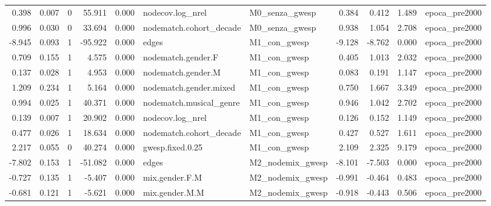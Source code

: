 \begin{table}
\begin{tabular}{rrrrrllrrrl}
    0.398 & 0.007 &        0 &   55.911 &     0.000 &        nodecov.log\_nrel &   M0\_senza\_gwesp &   0.384 &   0.412 &   1.489 &               epoca\_pre2000 \\
    0.996 & 0.030 &        0 &   33.694 &     0.000 & nodematch.cohort\_decade &   M0\_senza\_gwesp &   0.938 &   1.054 &   2.708 &               epoca\_pre2000 \\
   -8.945 & 0.093 &        1 &  -95.922 &     0.000 &                   edges &     M1\_con\_gwesp &  -9.128 &  -8.762 &   0.000 &               epoca\_pre2000 \\
    0.709 & 0.155 &        1 &    4.575 &     0.000 &      nodematch.gender.F &     M1\_con\_gwesp &   0.405 &   1.013 &   2.032 &               epoca\_pre2000 \\
    0.137 & 0.028 &        1 &    4.953 &     0.000 &      nodematch.gender.M &     M1\_con\_gwesp &   0.083 &   0.191 &   1.147 &               epoca\_pre2000 \\
    1.209 & 0.234 &        1 &    5.164 &     0.000 &  nodematch.gender.mixed &     M1\_con\_gwesp &   0.750 &   1.667 &   3.349 &               epoca\_pre2000 \\
    0.994 & 0.025 &        1 &   40.371 &     0.000 & nodematch.musical\_genre &     M1\_con\_gwesp &   0.946 &   1.042 &   2.702 &               epoca\_pre2000 \\
    0.139 & 0.007 &        1 &   20.902 &     0.000 &        nodecov.log\_nrel &     M1\_con\_gwesp &   0.126 &   0.152 &   1.149 &               epoca\_pre2000 \\
    0.477 & 0.026 &        1 &   18.634 &     0.000 & nodematch.cohort\_decade &     M1\_con\_gwesp &   0.427 &   0.527 &   1.611 &               epoca\_pre2000 \\
    2.217 & 0.055 &        0 &   40.274 &     0.000 &        gwesp.fixed.0.25 &     M1\_con\_gwesp &   2.109 &   2.325 &   9.179 &               epoca\_pre2000 \\
   -7.802 & 0.153 &        1 &  -51.082 &     0.000 &                   edges & M2\_nodemix\_gwesp &  -8.101 &  -7.503 &   0.000 &               epoca\_pre2000 \\
   -0.727 & 0.135 &        1 &   -5.407 &     0.000 &          mix.gender.F.M & M2\_nodemix\_gwesp &  -0.991 &  -0.464 &   0.483 &               epoca\_pre2000 \\
   -0.681 & 0.121 &        1 &   -5.621 &     0.000 &          mix.gender.M.M & M2\_nodemix\_gwesp &  -0.918 &  -0.443 &   0.506 &               epoca\_pre2000 \\

\end{tabular}
\end{table}
